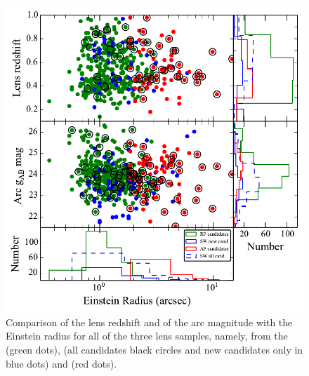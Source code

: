 \documentclass[useAMS,usenatbib,a4paper]{mn2e}
\begin{document}
\begin{figure}
\begin{center}
\includegraphics[scale=0.65]{sw-cfhtls-figs/zl_mg_re.pdf}
\caption{ \label{fig:zlre}
Comparison of the lens redshift and of the arc magnitude with the
Einstein radius for all of the three lens samples, namely, from the \rf (green dots),
\sw (all candidates black circles and new candidates only in blue dots)
and \af (red dots). }
\end{center}
\end{figure}
\end{document}
